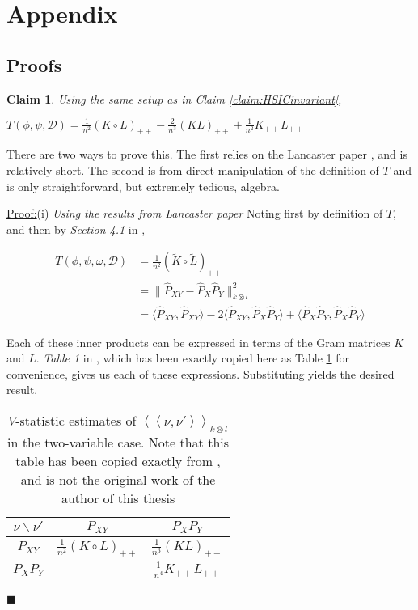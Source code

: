 \documentclass[12pt]{article}
\newtheorem{claim}{Claim}
\newenvironment{claimproof}[1]{\par\noindent\underline{Proof:}\space#1}{\hfill $\blacksquare$}
\numberwithin{claim}{section}
\numberwithin{lemma}{section}
\numberwithin{theorem}{section}
\begin{document}
\newpage
\section{Appendix}

\subsection{Proofs}

\begin{claim}\label{claim:HSICT}
Using the same setup as in Claim \ref{claim:HSICinvariant},

$T(\phi, \psi, \mathcal{D}) = \frac{1}{n^2} (K\circ L)_{++} - \frac{2}{n^3} (KL)_{++} + \frac{1}{n^2} K_{++}L_{++}$
\end{claim}

There are two ways to prove this. The first relies on the Lancaster paper \cite{sejdinovic2013kernel}, and is relatively short. The second is from direct manipulation of the definition of $T$ and is only straightforward, but extremely tedious, algebra.

\begin{claimproof}(i) \emph{Using the results from Lancaster paper}
Noting first by definition of $T$, and then by \emph{Section 4.1} in \cite{sejdinovic2013kernel},

\begin{align*}
T(\phi,\psi,\omega,\mathcal{D}) & = \frac{1}{n^2}(\tilde{K} \circ \tilde{L})_{++}\\
& = \| \hat{P}_{XY} - \hat{P}_X \hat{P}_Y \|_{k\otimes l }^2\\
& = \langle \hat{P}_{XY} ,\hat{P}_{XY} \rangle - 2 \langle \hat{P}_{XY} , \hat{P}_X \hat{P}_Y \rangle + \langle \hat{P}_X \hat{P}_Y, \hat{P}_X \hat{P}_Y\rangle
\end{align*}

Each of these inner products can be expressed in terms of the Gram matrices $K$ and $L$. \emph{Table 1} in \cite{sejdinovic2013kernel}, which has been exactly copied here as Table \ref{tab: 2vartab} for convenience, gives us each of these expressions. Substituting yields the desired result.

\begin{table}
\caption{\label{tab: 2vartab}{\footnotesize $V$-statistic estimates of $\left\langle \left\langle \nu,\nu'\right\rangle \right\rangle _{k\otimes l}$
in the two-variable case. Note that this table has been copied exactly from \cite{sejdinovic2013kernel}, and is not the original work of the author of this thesis}}


\centering{}{\small }%
\begin{tabular}{|c|c|c|}
\hline 
{\small $\nu\backslash\nu'$} & {\small $P_{XY}$} & {\small $P_{X}P_{Y}$}\tabularnewline
\hline 
\hline 
{\small $P_{XY}$} & {\small $\frac{1}{n^{2}}\left(K\circ L\right)_{++}$} & {\small $\frac{1}{n^{3}}\left(KL\right)_{++}$}\tabularnewline
\hline 
{\small $P_{X}P_{Y}$} &  & {\small $\frac{1}{n^{4}}K_{++}L_{++}$}\tabularnewline
\hline 
\end{tabular}
\end{table}

\end{claimproof}
\end{document}
